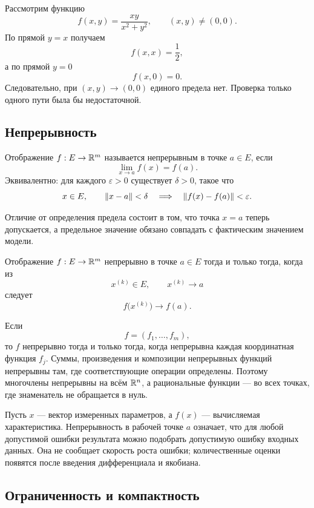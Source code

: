 \begin{example}
Рассмотрим функцию
\[
f(x,y)=
\frac{xy}{x^2+y^2},
\qquad
(x,y)\neq(0,0).
\]
По прямой \(y=x\) получаем
\[
f(x,x)=\frac12,
\]
а по прямой \(y=0\)
\[
f(x,0)=0.
\]
Следовательно, при \((x,y)\to(0,0)\) единого предела нет. Проверка только одного пути была бы недостаточной.
\end{example}

\subsection{Непрерывность}

\begin{definition}
Отображение \(f:E\to\mathbb{R}^m\) называется непрерывным в точке \(a\in E\), если
\[
\lim_{x\to a}f(x)=f(a).
\]
Эквивалентно: для каждого \(\varepsilon>0\) существует \(\delta>0\), такое что
\[
x\in E,
\qquad
\lVert x-a\rVert<\delta
\quad\Longrightarrow\quad
\lVert f(x)-f(a)\rVert<\varepsilon.
\]
\end{definition}

Отличие от определения предела состоит в том, что точка \(x=a\) теперь допускается, а предельное значение обязано совпадать с фактическим значением модели.

\begin{theorem}
Отображение \(f:E\to\mathbb{R}^m\) непрерывно в точке \(a\in E\) тогда и только тогда, когда из
\[
x^{(k)}\in E,
\qquad
x^{(k)}\to a
\]
следует
\[
f\bigl(x^{(k)}\bigr)\to f(a).
\]
\end{theorem}

Если
\[
f=(f_1,\dots,f_m),
\]
то \(f\) непрерывно тогда и только тогда, когда непрерывна каждая координатная функция \(f_j\). Суммы, произведения и композиции непрерывных функций непрерывны там, где соответствующие операции определены. Поэтому многочлены непрерывны на всём \(\mathbb{R}^n\), а рациональные функции --- во всех точках, где знаменатель не обращается в нуль.

\begin{application}
Пусть \(x\) --- вектор измеренных параметров, а \(f(x)\) --- вычисляемая характеристика. Непрерывность в рабочей точке \(a\) означает, что для любой допустимой ошибки результата можно подобрать допустимую ошибку входных данных. Она не сообщает скорость роста ошибки; количественные оценки появятся после введения дифференциала и якобиана.
\end{application}

\subsection{Ограниченность и компактность}

